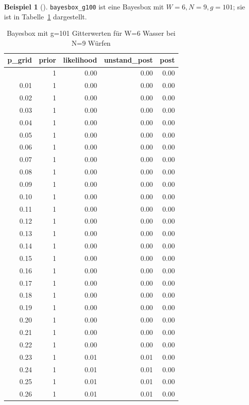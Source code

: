 \documentclass[
  ngerman,
  letterpaper,
  twoside,
  open=any]{scrbook}
\theoremstyle{definition}
\newtheorem{example}{Beispiel}[chapter]
\theoremstyle{plain}
\theoremstyle{definition}
\theoremstyle{definition}
\theoremstyle{remark}
\begin{document}
\begin{example}[]
\texttt{bayesbox\_g100} ist eine Bayesbox mit \(W=6, N=9, g=101\); sie
ist in Tabelle~\ref{tbl-bayesbox-g100} dargestellt.

{

\begin{longtable}[]{@{}rrrrr@{}}

\caption{\label{tbl-bayesbox-g100}Bayesbox mit g=101 Gitterwerten für
W=6 Wasser bei N=9 Würfen}

\tabularnewline

\toprule\noalign{}
p\_grid & prior & likelihood & unstand\_post & post \\
\midrule\noalign{}
\endhead
\bottomrule\noalign{}
\endlastfoot
0.00 & 1 & 0.00 & 0.00 & 0.00 \\
0.01 & 1 & 0.00 & 0.00 & 0.00 \\
0.02 & 1 & 0.00 & 0.00 & 0.00 \\
0.03 & 1 & 0.00 & 0.00 & 0.00 \\
0.04 & 1 & 0.00 & 0.00 & 0.00 \\
0.05 & 1 & 0.00 & 0.00 & 0.00 \\
0.06 & 1 & 0.00 & 0.00 & 0.00 \\
0.07 & 1 & 0.00 & 0.00 & 0.00 \\
0.08 & 1 & 0.00 & 0.00 & 0.00 \\
0.09 & 1 & 0.00 & 0.00 & 0.00 \\
0.10 & 1 & 0.00 & 0.00 & 0.00 \\
0.11 & 1 & 0.00 & 0.00 & 0.00 \\
0.12 & 1 & 0.00 & 0.00 & 0.00 \\
0.13 & 1 & 0.00 & 0.00 & 0.00 \\
0.14 & 1 & 0.00 & 0.00 & 0.00 \\
0.15 & 1 & 0.00 & 0.00 & 0.00 \\
0.16 & 1 & 0.00 & 0.00 & 0.00 \\
0.17 & 1 & 0.00 & 0.00 & 0.00 \\
0.18 & 1 & 0.00 & 0.00 & 0.00 \\
0.19 & 1 & 0.00 & 0.00 & 0.00 \\
0.20 & 1 & 0.00 & 0.00 & 0.00 \\
0.21 & 1 & 0.00 & 0.00 & 0.00 \\
0.22 & 1 & 0.00 & 0.00 & 0.00 \\
0.23 & 1 & 0.01 & 0.01 & 0.00 \\
0.24 & 1 & 0.01 & 0.01 & 0.00 \\
0.25 & 1 & 0.01 & 0.01 & 0.00 \\
0.26 & 1 & 0.01 & 0.01 & 0.00 \\

\end{longtable}}
\end{example}
\end{document}
